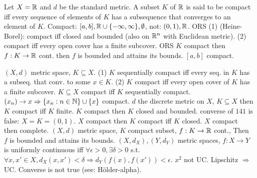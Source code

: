 
 Let $X = \mathbb{R}$ and $d$ be the standard metric.
A subset $K$ of $\mathbb{R}$ is said to be compact iff every sequence of elements of $K$
has a subsequence that converges to an element of $K$.
Compact: $[a,b], \mathbb{R} \cup \{-\infty, \infty\}, \emptyset$, not: $(0,1), \mathbb{R}$.
\wt{} ORS
(1) (Heine-Borel): compact iff closed and bounded (also on $\mathbb{R}^n$ with Euclidean metric).
(2) compact iff every open cover has a finite subcover.
\wt{} ORS $K$ compact then $f: K \to \mathbb{R}$ cont. then $f$ is bounded and attains its bounds.
$[a,b]$ compact.

 $(X, d)$ metric space, $K \subseteq X$.
(1) $K$ sequentially compact iff every seq. in $K$ has a subseq. that conv. to some $x \in K$.
(2) $K$ compact iff every open cover of $K$ has a finite subcover.
\wt{} $K \subseteq X$ compact iff $K$ sequentially compact.
 $(x_n) \to x \Rightarrow \{x_n : n \in \mathbb{N}\} \cup \{x\}$ compact.
 $d$ the discrete metric on $X$, $K \subseteq X$ then $K$ compact iff $K$ finite.
 $K$ compact then $K$ closed and bounded.
 converse of $141$ is false: $X = K = (0,1)$.
 $X$ compact then $K$ compact iff $K$ closed.
 $X$ compact then complete.
 $(X,d)$ metric space, $K$ compact subset, $f: K \to \mathbb{R}$ cont.,
Then $f$ is bounded and attains its bounds.
 $(X,d_X), (Y,d_Y)$ metric spaces,
$f: X \to Y$ is uniformly continuous iff $\forall \epsilon > 0, \exists \delta > 0$ s.t.
$\forall x, x' \in X, d_X(x, x') < \delta \Rightarrow d_Y(f(x), f(x')) < \epsilon$.
 $x^2$ not UC.
 Lipschitz $\Rightarrow$ UC.
Converse is not true (see: Hölder-alpha).
